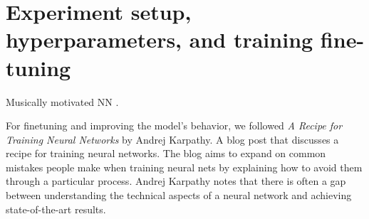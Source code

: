 \section{Experiment setup, hyperparameters, and training fine-tuning}


Musically motivated NN \cite{musicmotivCNN}.

For finetuning and improving the model's behavior, we followed \textit{A Recipe for Training Neural Networks} \cite{AndrejKarpathyHttp://karpathy.github.io/2019/04/25/recipe/} by Andrej Karpathy. A blog post that discusses a recipe for training neural networks. The blog aims to expand on common mistakes people make when training neural nets by explaining how to avoid them through a particular process. Andrej Karpathy notes that there is often a gap between understanding the technical aspects of a neural network and achieving state-of-the-art results.